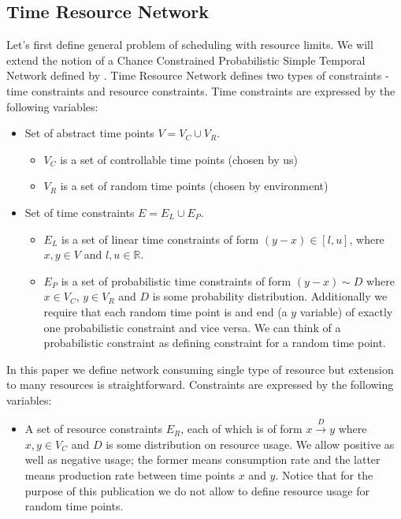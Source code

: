 \documentclass{article}
\begin{document}
\begin{multicols}{2}
\subsection{Time Resource Network}
Let's first define general problem of scheduling with resource limits. We will extend the notion of a Chance Constrained Probabilistic Simple Temporal Network defined by \cite{Fang2014}. Time Resource Network defines two types of constraints - time constraints and resource constraints. Time constraints are expressed by the following variables:
\begin{itemize}
\item Set of abstract time points $V = V_C \cup V_R $.
    \begin{itemize}
    \item $V_C$ is a set of controllable time points (chosen by us)
    \item $V_R$ is a set of random time points (chosen by environment)
    \end{itemize}
\item Set of time constraints $E = E_L \cup E_P $.
    \begin{itemize}
    \item $E_L$ is a set of linear time constraints of form $(y-x) \in [l,u]$, where $x,y \in V$ and $l,u \in \mathbb{R}$.
    \item $E_P$ is a set of probabilistic time constraints of form $ (y-x) \sim D$ where $x \in V_C$, $y \in V_R$ and $D$ is some probability distribution. Additionally we require that each random time point is and end (a $y$ variable) of exactly one probabilistic constraint and vice versa. We can think of a probabilistic constraint as defining constraint for a random time point.
    \end{itemize}
\end{itemize}
In this paper we define network consuming single type of resource but extension to many resources is straightforward. Constraints are expressed by the following variables:
\begin{itemize}
\item A set of resource constraints $E_R$, each of which is of form $x \xrightarrow{D} y$ where $x,y \in V_C$ and $D$ is some distribution on resource usage. We allow positive as well as negative usage; the former means consumption rate and the latter means production rate between time points $x$ and $y$. Notice that for the purpose of this publication we do not allow to define resource usage for random time points.
\end{itemize}


\end{multicols}
\end{document}

